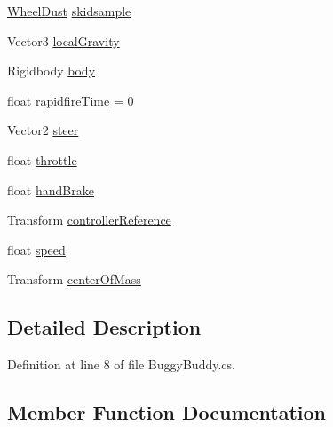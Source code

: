 \begin{DoxyCompactItemize}
\item 
\mbox{\hyperlink{class_valve_1_1_v_r_1_1_interaction_system_1_1_sample_1_1_wheel_dust}{Wheel\+Dust}} \mbox{\hyperlink{class_valve_1_1_v_r_1_1_interaction_system_1_1_sample_1_1_buggy_buddy_adf2051c465863e5d6f8543439225bf8d}{skidsample}}
\item 
Vector3 \mbox{\hyperlink{class_valve_1_1_v_r_1_1_interaction_system_1_1_sample_1_1_buggy_buddy_a3175cce36808b8b3862dfdf4003c1c17}{local\+Gravity}}
\item 
Rigidbody \mbox{\hyperlink{class_valve_1_1_v_r_1_1_interaction_system_1_1_sample_1_1_buggy_buddy_a9e5f51e497217d06491e62e801787cc7}{body}}
\item 
float \mbox{\hyperlink{class_valve_1_1_v_r_1_1_interaction_system_1_1_sample_1_1_buggy_buddy_a736f4f0a993011e419cf0a83274a311a}{rapidfire\+Time}} = 0
\item 
Vector2 \mbox{\hyperlink{class_valve_1_1_v_r_1_1_interaction_system_1_1_sample_1_1_buggy_buddy_acb6eb75ef41b673e8471dfad4c12118c}{steer}}
\item 
float \mbox{\hyperlink{class_valve_1_1_v_r_1_1_interaction_system_1_1_sample_1_1_buggy_buddy_af99c456400cf91319b7df00fc0d6c471}{throttle}}
\item 
float \mbox{\hyperlink{class_valve_1_1_v_r_1_1_interaction_system_1_1_sample_1_1_buggy_buddy_a08472779ed4ea518ea22bfe0f3db9f86}{hand\+Brake}}
\item 
Transform \mbox{\hyperlink{class_valve_1_1_v_r_1_1_interaction_system_1_1_sample_1_1_buggy_buddy_af2a926d91b091dc8ea3fc82265759508}{controller\+Reference}}
\item 
float \mbox{\hyperlink{class_valve_1_1_v_r_1_1_interaction_system_1_1_sample_1_1_buggy_buddy_a1c596116b13719bdc07db566a001215c}{speed}}
\item 
Transform \mbox{\hyperlink{class_valve_1_1_v_r_1_1_interaction_system_1_1_sample_1_1_buggy_buddy_a9a5c1abbcdac8f80c7254d6cdc64c0ed}{center\+Of\+Mass}}
\end{DoxyCompactItemize}


\subsection{Detailed Description}


Definition at line 8 of file Buggy\+Buddy.\+cs.



\subsection{Member Function Documentation}
\mbox{\label{class_valve_1_1_v_r_1_1_interaction_system_1_1_sample_1_1_buggy_buddy_a8abf825f7278839e55df1de8b098867b}} 
